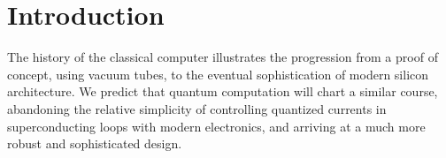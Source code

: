 \documentclass[12pt,a4paper]{amsart}
\numberwithin{equation}{section}
\theoremstyle{plain}
\theoremstyle{definition}
\begin{document}
\section{Introduction}

The history of the classical computer illustrates the progression from a proof of concept, using vacuum tubes, to the eventual sophistication of modern silicon architecture. We predict that quantum computation will chart a similar course, abandoning the relative simplicity of controlling quantized currents in superconducting loops with modern electronics, and arriving at a much more robust and sophisticated design.

\end{document}
